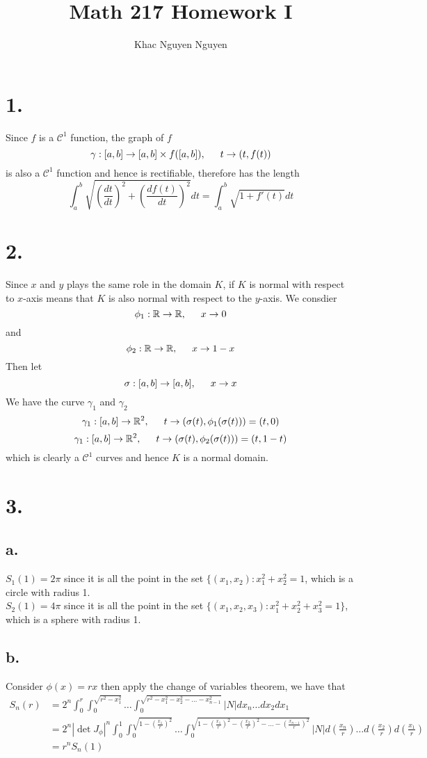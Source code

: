 \documentclass[11pt]{article}
\title{\textbf{Math 217 Homework I}}
\author{Khac Nguyen Nguyen}
\date{}
\begin{document}
\section*{1.}
Since $f$ is a $\mathcal{C}^1$ function, the graph of $f$
\[
    \gamma: [a,b] \to [a,b] \times f([a,b]), \indent t \to (t,f(t)) 
\]
is also a $\mathcal{C}^1$ function and hence is rectifiable, therefore has the length 
\[
    \int_a^b \sqrt{ \left(\frac{dt}{dt} \right)^2 + \left(\frac{df(t)}{dt} \right)^2} dt = \int_a^b \sqrt{1 + f'(t)} dt
\]
\pagebreak
\section*{2.}
Since $x$ and $y$ plays the same role in the domain $K$, if $K$ is normal with respect to $x$-axis means that 
$K$ is also normal with respect to the $y$-axis. We consdier
\[
    \phi_1: \mathbb{R} \to \mathbb{R}, \indent x \to 0   
\]
and 
\[
    \phi_2: \mathbb{R} \to \mathbb{R}, \indent x \to 1 - x  
\]
Then let 
\[
    \sigma: [a,b] \to [a,b], \indent x \to x    
\]
We have the curve $\gamma_1$ and $\gamma_2$
\[
    \gamma_1: [a,b] \to \mathbb{R}^2, \indent t \to (\sigma(t), \phi_1(\sigma(t))) = (t, 0)
\]
\[
    \gamma_1: [a,b] \to \mathbb{R}^2, \indent t \to (\sigma(t), \phi_2(\sigma(t))) = (t, 1-t)
\]
which is clearly a $\mathcal{C}^1$ curves and hence $K$ is a normal domain.
\pagebreak
\section*{3.}
\subsection*{a.}
$S_1(1) = 2\pi$ since it is all the point in the set $\{(x_1, x_2): x_1^2 + x_2^2 = 1$, which is a circle with radius 1. \\
$S_2(1) = 4\pi $ since it is all the point in the set $\{(x_1, x_2, x_3): x_1^2 + x_2^2 +x_3^2 = 1\}$, which is a sphere with radius 1. 
\subsection*{b.}
Consider $\phi(x) = rx$ then apply the change of variables theorem, we have that 
\begin{equation*}
    \begin{aligned}
        S_n(r) &=2^n \int_0^r \int_0^{\sqrt{r^2-x_1^2}} \ldots \int_0^{\sqrt{r^2 - x_1^2 - x_2^2 - \ldots - x_{n-1}^2}} |N| dx_n \ldots dx_2 dx_1 \\
        &= 2^n |\det J_\phi|^n \int_0^1 \int_0^{\sqrt{1-\left(\frac{x_1}{r}\right)^2}} \ldots \int_0^{\sqrt{1 - \left(\frac{x_1}{r}\right)^2 - \left(\frac{x_2}{r}\right)^2 - \ldots - \left(\frac{x_{n-1}}{r}\right)^2}} |N| d\left(\frac{x_n}{r}\right) \ldots d\left(\frac{x_2}{r}\right) d\left(\frac{x_1}{r}\right)\\
        &= r^n S_n(1)
    \end{aligned}
\end{equation*}
\end{document}
